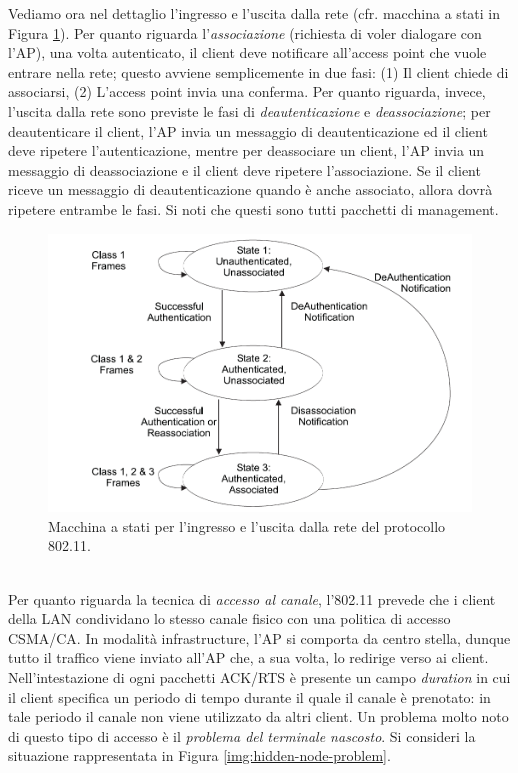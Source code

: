 Vediamo ora nel dettaglio l'ingresso e l'uscita dalla rete (cfr. macchina a stati in Figura \ref{img:802_11-state-machine}). Per quanto riguarda l'\textit{associazione} (richiesta di voler dialogare con l'AP), una volta autenticato, il client deve notificare all'access point che vuole entrare nella rete; questo avviene semplicemente in due fasi: (1) Il client chiede di associarsi, (2) L'access point invia una conferma. Per quanto riguarda, invece, l'uscita dalla rete sono previste le fasi di \textit{deautenticazione} e \textit{deassociazione}; per deautenticare il client, l'AP invia un messaggio di deautenticazione ed il client deve ripetere l'autenticazione, mentre per deassociare un client, l'AP invia un messaggio di deassociazione e il client deve ripetere l'associazione. Se il client riceve un messaggio di deautenticazione quando è anche associato, allora dovrà ripetere entrambe le fasi. Si noti che questi sono tutti pacchetti di management.
\begin{figure}[htbp]
	\centering
	\includegraphics[scale = 0.3]{images/802_11-state-machine}
	\caption{Macchina a stati per l'ingresso e l'uscita dalla rete del protocollo 802.11.}
	\label{img:802_11-state-machine}
\end{figure}\\
Per quanto riguarda la tecnica di \textit{accesso al canale}, l'802.11 prevede che i client della LAN condividano lo stesso canale fisico con una politica di accesso CSMA/CA. In modalità infrastructure, l'AP si comporta da centro stella, dunque tutto il traffico viene inviato all'AP che, a sua volta, lo redirige verso ai client. Nell'intestazione di ogni pacchetti ACK/RTS è presente un campo \textit{duration} in cui il client specifica un periodo di tempo durante il quale il canale è prenotato: in tale periodo il canale non viene utilizzato da altri client. Un problema molto noto di questo tipo di accesso è il \textit{problema del terminale nascosto}. Si consideri la situazione rappresentata in Figura \ref{img:hidden-node-problem}.
